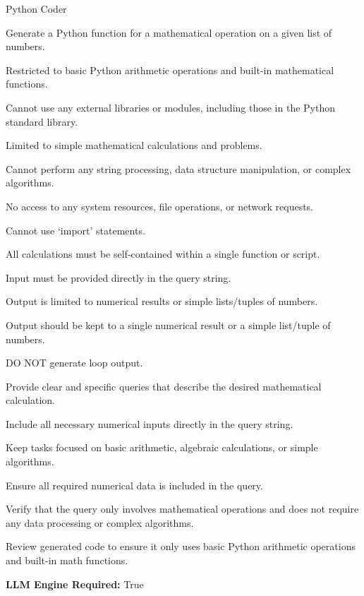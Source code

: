 \begin{tooldescbox}{{Python Coder}}
\begin{itemize}[left=0pt, label={}, itemsep=0pt, parsep=0pt]
\enspace{} Generate a Python function for a mathematical operation on a given list of numbers.
\end{itemize}

\begin{limitationbox}
\begin{toolenum}
    \item Restricted to basic Python arithmetic operations and built-in mathematical functions.
    \item Cannot use any external libraries or modules, including those in the Python standard library.
    \item Limited to simple mathematical calculations and problems.
    \item Cannot perform any string processing, data structure manipulation, or complex algorithms.
    \item No access to any system resources, file operations, or network requests.
    \item Cannot use `import' statements.
    \item All calculations must be self-contained within a single function or script.
    \item Input must be provided directly in the query string.
    \item Output is limited to numerical results or simple lists/tuples of numbers.
    \item Output should be kept to a single numerical result or a simple list/tuple of numbers.
    \item DO NOT generate loop output.
\end{toolenum}
\end{limitationbox}

\begin{bestpracticebox}
\begin{toolenum}
    \item Provide clear and specific queries that describe the desired mathematical calculation.
    \item Include all necessary numerical inputs directly in the query string.
    \item Keep tasks focused on basic arithmetic, algebraic calculations, or simple algorithms.
    \item Ensure all required numerical data is included in the query.
    \item Verify that the query only involves mathematical operations and does not require any data processing or complex algorithms.
    \item Review generated code to ensure it only uses basic Python arithmetic operations and built-in math functions.
\end{toolenum}
\end{bestpracticebox}

\textbf{LLM Engine Required:} True
\end{tooldescbox}